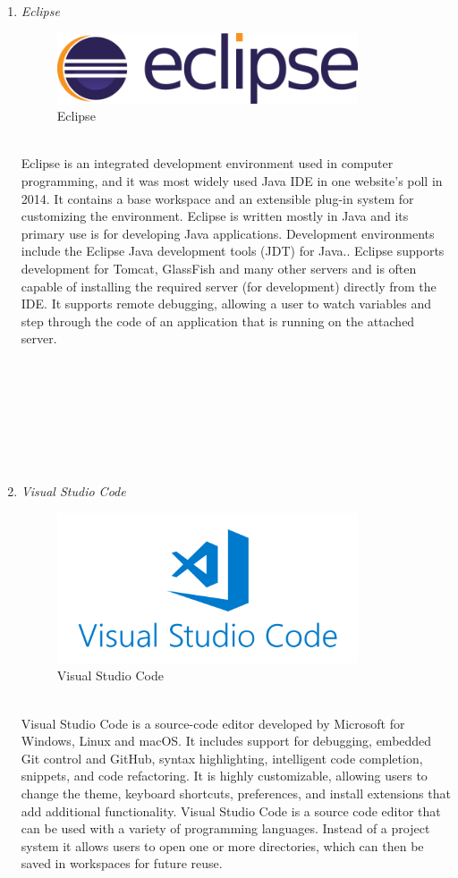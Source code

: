 \documentclass[conference]{IEEEtran}
\begin{document}
\begin{enumerate}
      \item \textit{Eclipse}
                      \begin{figure}[htbp]
	\centerline{\includegraphics[width=89mm, scale=0.5]{fig/eclipse.png}}
	\caption{Eclipse}
	\label{fig}
	\end{figure}
   \\Eclipse is an integrated development environment used in computer programming, and it was most widely used Java IDE in one website’s poll in 2014.  It contains a base workspace and an extensible plug-in system for customizing the environment. Eclipse is written mostly in Java and its primary use is for developing Java applications. Development environments include the Eclipse Java development tools (JDT) for Java.. Eclipse supports development for Tomcat, GlassFish and many other servers and is often capable of installing the required server (for development) directly from the IDE. It supports remote debugging, allowing a user to watch variables and step through the code of an application that is running on the attached server.\\
   \\
   \\
   \\
   \\
   \\
   \\
   \\
      \item \textit{Visual Studio Code }
                      \begin{figure}[htbp]
	\centerline{\includegraphics[width=89mm, scale=0.5]{fig/vscode.png}}
	\caption{Visual Studio Code}
	\label{fig}
	\end{figure}
   \\Visual Studio Code is a source-code editor developed by Microsoft for Windows, Linux and macOS. It includes support for debugging, embedded Git control and GitHub, syntax highlighting, intelligent code completion, snippets, and code refactoring. It is highly customizable, allowing users to change the theme, keyboard shortcuts, preferences, and install extensions that add additional functionality. Visual Studio Code is a source code editor that can be used with a variety of programming languages. Instead of a project system it allows users to open one or more directories, which can then be saved in workspaces for future reuse.\\

\end{enumerate}
\end{document}
